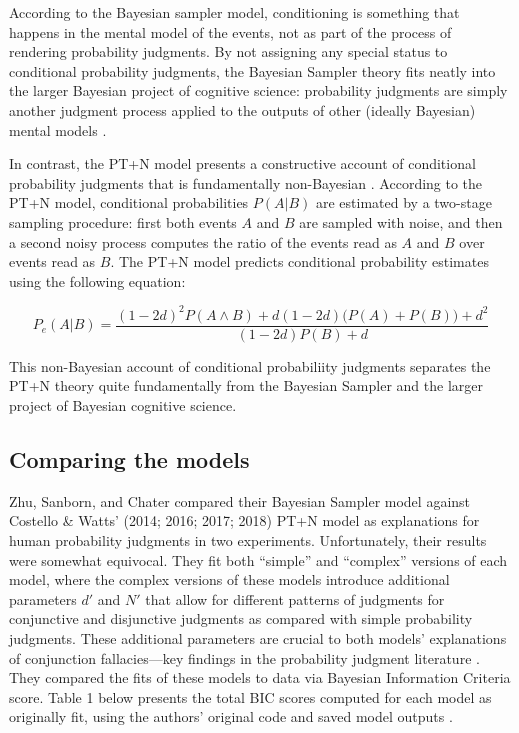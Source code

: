 \documentclass[
  english,
  man,floatsintext]{apa6}
\begin{document}
According to the Bayesian sampler model, conditioning is something that happens in the mental model of the events, not as part of the process of rendering probability judgments. By not assigning any special status to conditional probability judgments, the Bayesian Sampler theory fits neatly into the larger Bayesian project of cognitive science: probability judgments are simply another judgment process applied to the outputs of other (ideally Bayesian) mental models \autocite{chater.etal2020}.

In contrast, the PT+N model presents a constructive account of conditional probability judgments that is fundamentally non-Bayesian \autocite{costello.watts2016}. According to the PT+N model, conditional probabilities \(P(A|B)\) are estimated by a two-stage sampling procedure: first both events \(A\) and \(B\) are sampled with noise, and then a second noisy process computes the ratio of the events read as \(A\) and \(B\) over events read as \(B\). The PT+N model predicts conditional probability estimates using the following equation:

\[P_e(A|B) = \frac{(1-2d)^2P(A \land B) + d(1-2d)\big(P(A)+P(B)\big)+d^2}{(1-2d)P(B)+d}\]

This non-Bayesian account of conditional probabiliity judgments separates the PT+N theory quite fundamentally from the Bayesian Sampler and the larger project of Bayesian cognitive science.

\hypertarget{comparing-the-models}{%
\subsection{Comparing the models}\label{comparing-the-models}}

Zhu, Sanborn, and Chater \autocite*{zhu.etal2020} compared their Bayesian Sampler model against Costello \& Watts' (2014; 2016; 2017; 2018) PT+N model as explanations for human probability judgments in two experiments. Unfortunately, their results were somewhat equivocal. They fit both ``simple'' and ``complex'' versions of each model, where the complex versions of these models introduce additional parameters \(d'\) and \(N'\) that allow for different patterns of judgments for conjunctive and disjunctive judgments as compared with simple probability judgments. These additional parameters are crucial to both models' explanations of conjunction fallacies---key findings in the probability judgment literature \autocite{costello.watts2017,zhu.etal2020}. They compared the fits of these models to data via Bayesian Information Criteria score. Table 1 below presents the total BIC scores computed for each model as originally fit, using the authors' original code and saved model outputs \autocite[Supplementary materials]{zhu.etal2020}.
\end{document}
